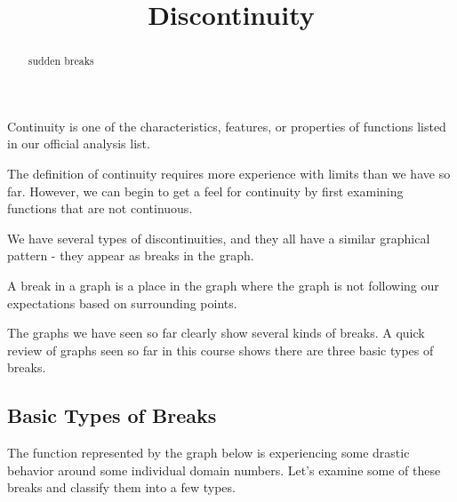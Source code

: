 \documentclass{ximera}
\title{Discontinuity}
\begin{document}
\begin{abstract}
sudden breaks
\end{abstract}
\maketitle



Continuity is one of the characteristics, features, or properties of functions listed in our official analysis list.

The definition of continuity requires more experience with limits than we have so far. However, we can begin to get a feel for continuity by first examining functions that are not continuous.

We have several types of discontinuities, and they all have a similar graphical pattern - they appear as breaks in the graph.


A break in a graph is a place in the graph where the graph is not following our expectations based on surrounding points.



The graphs we have seen so far clearly show several kinds of breaks.  A quick review of graphs seen so far in this course shows there are three basic types of breaks.





\subsection*{Basic Types of Breaks}


The function represented by the graph below is experiencing some drastic behavior around some individual domain numbers.  Let's examine some of these breaks and classify them into a few types.
\end{document}
